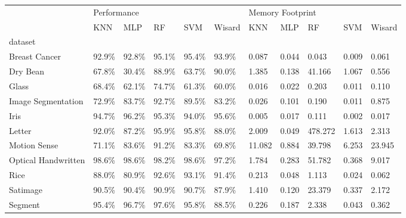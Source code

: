 \begin{tabular}{lllllllllll}
\toprule
{} & \multicolumn{5}{l}{Performance} & \multicolumn{5}{l}{Memory Footprint} \\
{} &         KNN &    MLP &     RF &    SVM & Wisard &              KNN &    MLP &       RF &    SVM &  Wisard \\
dataset             &             &        &        &        &        &                  &        &          &        &         \\
\midrule
Breast Cancer       &       92.9\% &  92.8\% &  95.1\% &  95.4\% &  93.9\% &            0.087 &  0.044 &    0.043 &  0.009 &   0.061 \\
Dry Bean            &       67.8\% &  30.4\% &  88.9\% &  63.7\% &  90.0\% &            1.385 &  0.138 &   41.166 &  1.067 &   0.556 \\
Glass               &       68.4\% &  62.1\% &  74.7\% &  61.3\% &  60.0\% &            0.016 &  0.022 &    0.203 &  0.011 &   0.110 \\
Image Segmentation  &       72.9\% &  83.7\% &  92.7\% &  89.5\% &  83.2\% &            0.026 &  0.101 &    0.190 &  0.011 &   0.875 \\
Iris                &       94.7\% &  96.2\% &  95.3\% &  94.0\% &  95.6\% &            0.005 &  0.017 &    0.111 &  0.002 &   0.017 \\
Letter              &       92.0\% &  87.2\% &  95.9\% &  95.8\% &  88.0\% &            2.009 &  0.049 &  478.272 &  1.613 &   2.313 \\
Motion Sense        &       71.1\% &  83.6\% &  91.2\% &  83.3\% &  69.8\% &           11.082 &  0.884 &   39.798 &  6.253 &  23.945 \\
Optical Handwritten &       98.6\% &  98.6\% &  98.2\% &  98.6\% &  97.2\% &            1.784 &  0.283 &   51.782 &  0.368 &   9.017 \\
Rice                &       88.0\% &  80.9\% &  92.6\% &  93.1\% &  91.4\% &            0.213 &  0.048 &    1.113 &  0.024 &   0.062 \\
Satimage            &       90.5\% &  90.4\% &  90.9\% &  90.7\% &  87.9\% &            1.410 &  0.120 &   23.379 &  0.337 &   2.172 \\
Segment             &       95.4\% &  96.7\% &  97.6\% &  95.8\% &  88.5\% &            0.226 &  0.187 &    2.338 &  0.043 &   0.362 \\

\end{tabular}
